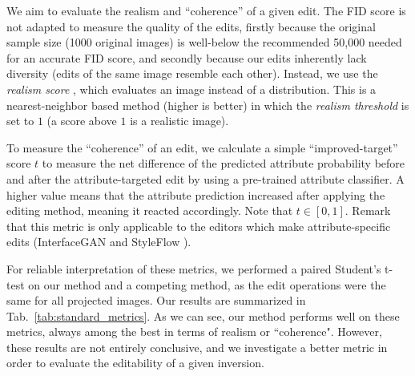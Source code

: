 We aim to evaluate the realism and ``coherence'' of a given edit. The FID score 
\citep{fidscore} is not adapted to measure the quality of the edits, firstly because the 
original sample size (1000 original images) is well-below the recommended 50,000 needed 
for an accurate FID score, and secondly because our edits inherently lack diversity 
(edits of the same image resemble each other).
Instead, we use the \emph{realism score} \citep{precision_recall}, which evaluates an 
image instead of a distribution. This is a nearest-neighbor based method 
(higher is better) in which the \emph{realism threshold} is set to $1$ (a score above 
$1$ is a realistic image). 

To measure the ``coherence'' of an edit, we calculate a simple ``improved-target'' score
 $t$ to measure the net difference of the predicted attribute probability before and 
 after the attribute-targeted edit by using a pre-trained attribute classifier. A higher
  value means that the attribute prediction increased after applying the editing method,
   meaning it reacted accordingly. Note that $t \in [0, 1]$. Remark that this metric is 
   only applicable to the editors which make attribute-specific edits (InterfaceGAN 
   \citep{shen2020} and StyleFlow \citep{abdal2020styleflow}).

For reliable interpretation of these metrics, we performed a paired Student's t-test on 
our method and a competing method, as the edit operations were the same for all projected
 images. Our results are summarized in Tab.~\ref{tab:standard_metrics}. As we can see, 
 our method performs well on these metrics, always among the best in terms of realism or 
 ``coherence". However, these results are not entirely conclusive, and we investigate a 
 better metric in order to evaluate the editability of a given inversion.

